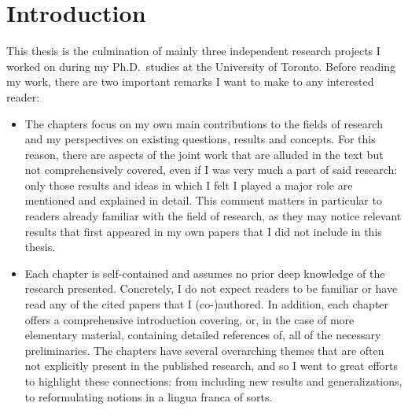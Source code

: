 \chapter{Introduction}\label{ch:introduction}

This thesis is the culmination of mainly three independent research projects I worked on during my Ph.D.\ studies at the University of Toronto.
Before reading my work, there are two important remarks I want to make to any interested reader:

\begin{itemize}
    \item The chapters focus on my own main contributions to the fields of research and my perspectives on existing questions, results and concepts.
    For this reason, there are aspects of the joint work that are alluded in the text but not comprehensively covered, even if I was very much a part of said research: only those results and ideas in which I felt I played a major role are mentioned and explained in detail.
    This comment matters in particular to readers already familiar with the field of research, as they may notice relevant results that first appeared in my own papers that I did not include in this thesis.

    \item Each chapter is self-contained and assumes no prior deep knowledge of the research presented.
    Concretely, I do not expect readers to be familiar or have read any of the cited papers that I (co-)authored.
    In addition, each chapter offers a comprehensive introduction covering, or, in the case of more elementary material, containing detailed references of, all of the necessary preliminaries.
    The chapters have several overarching themes that are often not explicitly present in the published research, and so I went to great efforts to highlight these connections: from including new results and generalizations, to reformulating notions in a lingua franca of sorts.
\end{itemize}

